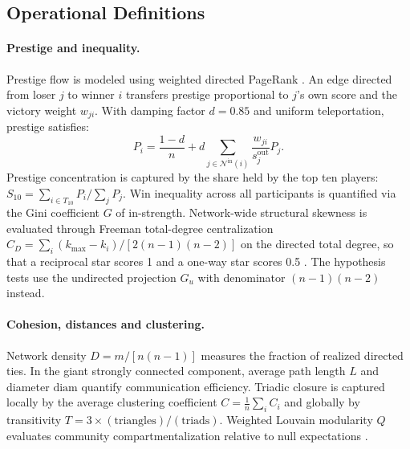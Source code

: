 \documentclass[12pt, a4paper]{article}
\begin{document}
\subsection{Operational Definitions}

\paragraph{Prestige and inequality.} Prestige flow is modeled using weighted directed PageRank \cite{radicchi2011,newman2018}. An edge directed from loser $j$ to winner $i$ transfers prestige proportional to $j$'s own score and the victory weight $w_{ji}$. With damping factor $d = 0.85$ and uniform teleportation, prestige satisfies:
\begin{equation}
P_i = \frac{1-d}{n} + d \sum_{j \in \mathcal{N}^{\mathrm{in}}(i)} \frac{w_{ji}}{s_j^{\mathrm{out}}} P_j.
\end{equation}
Prestige concentration is captured by the share held by the top ten players: $S_{10} = \sum_{i \in T_{10}} P_i / \sum_j P_j$. Win inequality across all participants is quantified via the Gini coefficient $G$ of in-strength. Network-wide structural skewness is evaluated through Freeman total-degree centralization $C_D = \sum_i (k_{\max} - k_i) / [2(n-1)(n-2)]$ on the directed total degree, so that a reciprocal star scores 1 and a one-way star scores 0.5 \cite{freeman1978}. The hypothesis tests use the undirected projection $G_u$ with denominator $(n-1)(n-2)$ instead.

\paragraph{Cohesion, distances and clustering.} Network density $D = m / [n(n-1)]$ measures the fraction of realized directed ties. In the giant strongly connected component, average path length $L$ and diameter $\mathrm{diam}$ quantify communication efficiency. Triadic closure is captured locally by the average clustering coefficient $C = \frac{1}{n} \sum_i C_i$ and globally by transitivity $T = 3 \times (\text{triangles}) / (\text{triads})$. Weighted Louvain modularity $Q$ evaluates community compartmentalization relative to null expectations \cite{blondel2008}.
\end{document}
